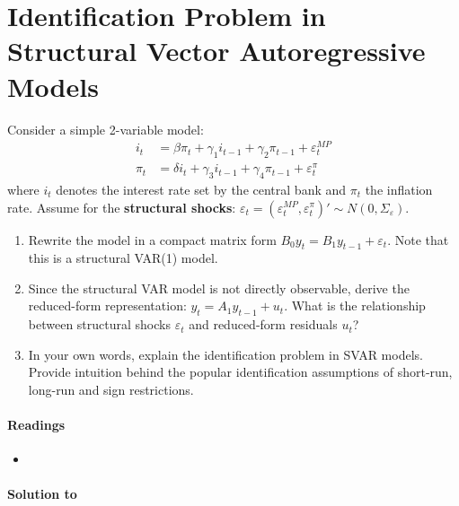 \section[Identification Problem in Structural Vector Autoregressive Models]{Identification Problem in Structural Vector Autoregressive Models\label{ex:IdentificationProblemSVAR}}
Consider a simple 2-variable model:
\begin{align*}
i_t &=  \beta \pi_t + \gamma_1 i_{t-1} + \gamma_2 \pi_{t-1} + \varepsilon_t^{MP} \\
\pi_t &=  \delta i_t + \gamma_3 i_{t-1} + \gamma_4 \pi_{t-1} + \varepsilon_t^{\pi}
\end{align*}
where \(i_t\) denotes the interest rate set by the central bank and \(\pi_t\) the inflation rate.
Assume for the \textbf{structural shocks}:
\(\varepsilon_{t}=(\varepsilon_t^{MP}, \varepsilon_t^{\pi})' \sim N(0,\Sigma_\varepsilon)\).
\begin{enumerate}
\item Rewrite the model in a compact matrix form \(B_0 y_t = B_1 y_{t-1} + \varepsilon_{t}\).
Note that this is a structural VAR(1) model.
\item Since the structural VAR model is not directly observable, derive the reduced-form representation:
\(y_t = A_1 y_{t-1} + u_t\).
What is the relationship between structural shocks \(\varepsilon_t\) and reduced-form residuals \(u_t\)?
\item In your own words, explain the identification problem in SVAR models.
Provide intuition behind the popular identification assumptions of short-run, long-run and sign restrictions.
\end{enumerate}

\paragraph{Readings}
\begin{itemize}
\item \textcite[Ch.~7.6]{Kilian.Lutkepohl_2017_StructuralVectorAutoregressive}
\end{itemize}

\begin{solution}\textbf{Solution to }
\ifDisplaySolutions

\fi
\newpage
\end{solution}
